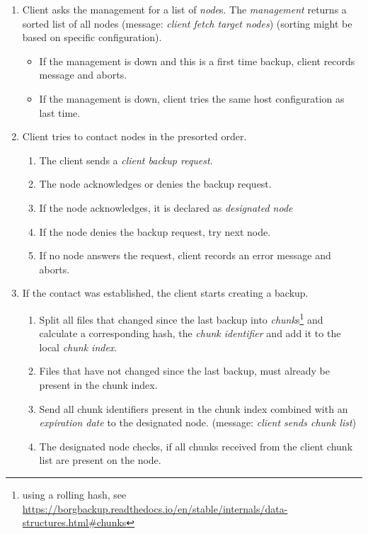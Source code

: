 \begin{enumerate}
    \item Client asks the management for a list of \emph{node}s. The \emph{management} returns a sorted list of all nodes (message: \emph{client fetch target nodes}) (sorting might be based on specific configuration).
        \begin{itemize}
            \item If the management is down and this is a first time backup, client records message and aborts.
            \item If the management is down, client tries the same host configuration as last time.
        \end{itemize}
    \item Client tries to contact nodes in the presorted order.
        \begin{enumerate}
            \item The client sends a \emph{client backup request}. %
            \item The node acknowledges or denies the backup request.
            \item If the node acknowledges, it is declared as \emph{designated node}
            \item If the node denies the backup request, try next node.
            \item If no node answers the request, client records an error message and aborts.
       \end{enumerate}
   \item If the contact was established, the client starts creating a backup.
        \begin{enumerate}
            \item Split all files that changed since the last backup into \emph{chunk}s\footnote{using a rolling hash, see \url{https://borgbackup.readthedocs.io/en/stable/internals/data-structures.html\#chunks}} and calculate a corresponding hash, the \emph{chunk identifier} and add it to the local \emph{chunk index}.
            \item Files that have not changed since the last backup, must already be present in the chunk index.
            \item Send all chunk identifiers present in the chunk index combined with an \emph{expiration date} to the designated node. (message: \emph{client sends chunk list})
            \item The designated node checks, if all chunks received from the client chunk list are present on the node.

\end{enumerate}
\end{enumerate}
